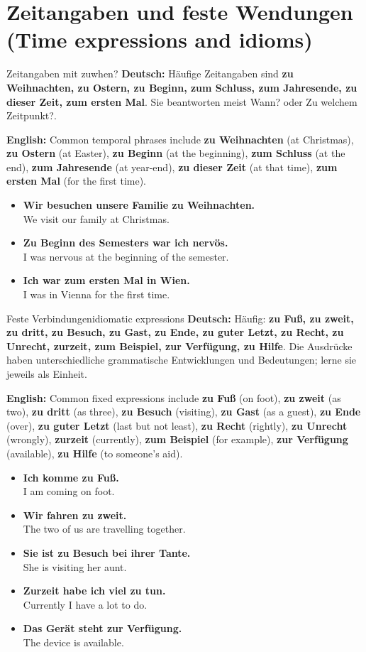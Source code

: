 \documentclass[a4paper,11pt]{article}
\newcommand{\GermanText}[1]{\textbf{Deutsch: }#1\par}
\newcommand{\EnglishText}[1]{{\small\color{SoftGray}\textbf{English: }#1\par}}
\newcommand{\ExampleItem}[2]{\item \textbf{#1}\\{\small\color{SoftGray}#2}}
\begin{document}
\section{Zeitangaben und feste Wendungen (Time expressions and idioms)}
\begin{grammarentry}{Zeitangaben mit zu}{when?}
\GermanText{Häufige Zeitangaben sind \textbf{zu Weihnachten, zu Ostern, zu Beginn, zum Schluss, zum Jahresende, zu dieser Zeit, zum ersten Mal}. Sie beantworten meist \glqq Wann?\grqq{} oder \glqq Zu welchem Zeitpunkt?\grqq.}
\EnglishText{Common temporal phrases include \textbf{zu Weihnachten} (at Christmas), \textbf{zu Ostern} (at Easter), \textbf{zu Beginn} (at the beginning), \textbf{zum Schluss} (at the end), \textbf{zum Jahresende} (at year-end), \textbf{zu dieser Zeit} (at that time), \textbf{zum ersten Mal} (for the first time).}
\end{grammarentry}
\begin{exbox}\begin{itemize}
\ExampleItem{Wir besuchen unsere Familie zu Weihnachten.}{We visit our family at Christmas.}
\ExampleItem{Zu Beginn des Semesters war ich nervös.}{I was nervous at the beginning of the semester.}
\ExampleItem{Ich war zum ersten Mal in Wien.}{I was in Vienna for the first time.}
\end{itemize}\end{exbox}
\begin{grammarentry}{Feste Verbindungen}{idiomatic expressions}
\GermanText{Häufig: \textbf{zu Fuß, zu zweit, zu dritt, zu Besuch, zu Gast, zu Ende, zu guter Letzt, zu Recht, zu Unrecht, zurzeit, zum Beispiel, zur Verfügung, zu Hilfe}. Die Ausdrücke haben unterschiedliche grammatische Entwicklungen und Bedeutungen; lerne sie jeweils als Einheit.}
\EnglishText{Common fixed expressions include \textbf{zu Fuß} (on foot), \textbf{zu zweit} (as two), \textbf{zu dritt} (as three), \textbf{zu Besuch} (visiting), \textbf{zu Gast} (as a guest), \textbf{zu Ende} (over), \textbf{zu guter Letzt} (last but not least), \textbf{zu Recht} (rightly), \textbf{zu Unrecht} (wrongly), \textbf{zurzeit} (currently), \textbf{zum Beispiel} (for example), \textbf{zur Verfügung} (available), \textbf{zu Hilfe} (to someone's aid).}
\end{grammarentry}
\begin{exbox}\begin{itemize}
\ExampleItem{Ich komme zu Fuß.}{I am coming on foot.}
\ExampleItem{Wir fahren zu zweit.}{The two of us are travelling together.}
\ExampleItem{Sie ist zu Besuch bei ihrer Tante.}{She is visiting her aunt.}
\ExampleItem{Zurzeit habe ich viel zu tun.}{Currently I have a lot to do.}
\ExampleItem{Das Gerät steht zur Verfügung.}{The device is available.}
\end{itemize}\end{exbox}
\end{document}
